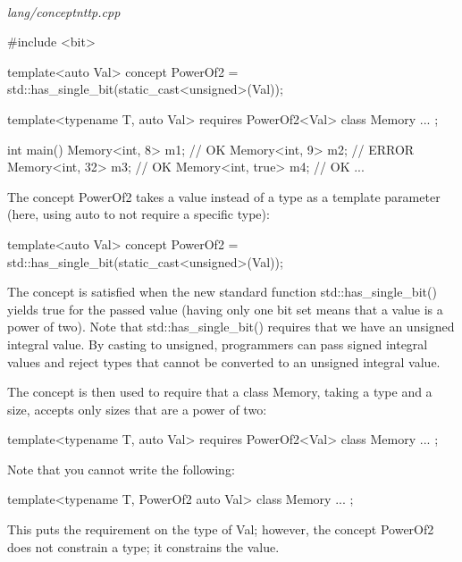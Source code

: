 \noindent
\hspace*{\fill} \\ %
\textit{lang/conceptnttp.cpp}

\begin{cpp}
#include <bit>

template<auto Val>
concept PowerOf2 = std::has_single_bit(static_cast<unsigned>(Val));

template<typename T, auto Val>
requires PowerOf2<Val>
class Memory {
	...
};

int main()
{
	Memory<int, 8> m1; // OK
	Memory<int, 9> m2; // ERROR
	Memory<int, 32> m3; // OK
	Memory<int, true> m4; // OK
	...
}
\end{cpp}

The concept PowerOf2 takes a value instead of a type as a template parameter (here, using auto to not require a specific type):

\begin{cpp}
template<auto Val>
concept PowerOf2 = std::has_single_bit(static_cast<unsigned>(Val));
\end{cpp}

The concept is satisfied when the new standard function std::has\_single\_bit() yields true for the passed value (having only one bit set means that a value is a power of two). Note that std::has\_single\_bit() requires that we have an unsigned integral value. By casting to unsigned, programmers can pass signed integral values and reject types that cannot be converted to an unsigned integral value.

The concept is then used to require that a class Memory, taking a type and a size, accepts only sizes that are a power of two:

\begin{cpp}
template<typename T, auto Val>
requires PowerOf2<Val>
class Memory {
	...
};
\end{cpp}

Note that you cannot write the following:


\begin{cpp}
template<typename T, PowerOf2 auto Val>
class Memory {
	...
};
\end{cpp}

This puts the requirement on the type of Val; however, the concept PowerOf2 does not constrain a type; it constrains the value.








